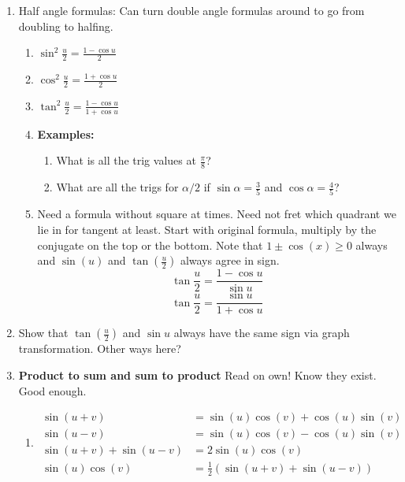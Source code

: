 \documentclass{article}
\begin{document}
\begin{enumerate}
\item Half angle formulas: Can turn double angle formulas around to go from doubling to halfing.
\begin{enumerate}
\item $\sin^2 \frac{u}{2} = \frac{1-\cos u}{2}$
\item $\cos^2 \frac{u}{2} = \frac{1+\cos u}{2}$
\item $\tan^2 \frac{u}{2} = \frac{1-\cos u}{1+\cos u }$
\item {\bf Examples:}
\begin{enumerate}
\item What is all the trig values at $\frac{\pi}{8}$?
\item What are all the trigs for $\alpha/2$ if $\sin\alpha = \frac{3}{5}$ and $\cos \alpha = \frac{4}{5}$?
\end{enumerate}
\item Need a formula without square at times. Need not fret which quadrant we lie in for tangent at least. Start with original formula, multiply by the conjugate on the top or the bottom. Note that $1\pm\cos(x)\geq 0$ always and $\sin(u)$ and $\tan(\frac{u}{2})$ always agree in sign.
$$
\tan \frac{u}{2} = \frac{1-\cos u}{\sin u}
$$
$$
\tan \frac{u}{2} = \frac{\sin u}{1+\cos u}
$$
\end{enumerate}
\item Show that $\tan(\frac{u}{2})$ and $\sin u$ always have the same sign via graph transformation. Other ways here?

\item {\bf Product to sum and sum to product} Read on own! Know they exist. Good enough.
\begin{enumerate}
\item 
\begin{align*}
\sin(u+v) &= \sin(u)\cos(v)+\cos(u)\sin(v) \\
\sin(u-v) &= \sin(u)\cos(v)-\cos(u)\sin(v) \\
\sin(u+v) + \sin(u-v) &= 2\sin(u)\cos(v) \\
\sin(u)\cos(v) &= \frac{1}{2} \left(\sin(u+v) + \sin(u-v) \right)
\end{align*}
\end{enumerate}
\end{enumerate}


\end{document}
